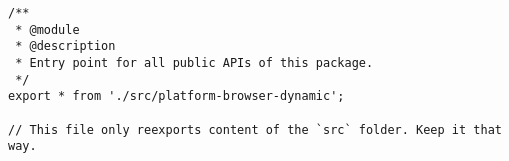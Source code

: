 \begin{verbatim}
/**
 * @module
 * @description
 * Entry point for all public APIs of this package.
 */
export * from './src/platform-browser-dynamic';

// This file only reexports content of the `src` folder. Keep it that way.
\end{verbatim}
